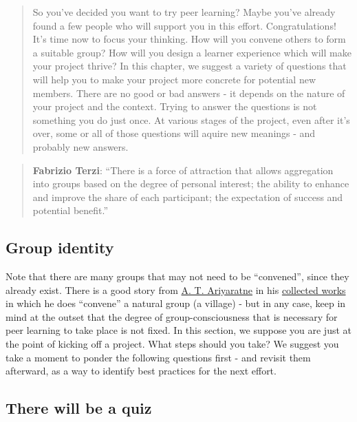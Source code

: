
\begin{quote}
So you've decided you want to try peer learning? Maybe you've already
found a few people who will support you in this effort. Congratulations!
It's time now to focus your thinking. How will you convene others to
form a suitable group? How will you design a learner experience which
will make your project thrive? In this chapter, we suggest a variety of
questions that will help you to make your project more concrete for
potential new members. There are no good or bad answers - it depends on
the nature of your project and the context. Trying to answer the
questions is not something you do just once. At various stages of the
project, even after it's over, some or all of those questions will
aquire new meanings - and probably new answers.
\end{quote}

\begin{quote}
\textbf{Fabrizio Terzi}: ``There is a force of attraction that allows
aggregation into groups based on the degree of personal interest; the
ability to enhance and improve the share of each participant; the
expectation of success and potential benefit.''
\end{quote}

\subsection{Group identity}

Note that there are many groups that may not need to be ``convened'',
since they already exist. There is a good story from
\href{http://www.sarvodayausa.org/learn/a-t-ariyartne/}{A. T.
Ariyaratne} in his
\href{http://www.sarvodaya.org/about/philosophy/collected-works-vol-1/rural-self-help}{collected
works} in which he does ``convene'' a natural group (a village) - but
in any case, keep in mind at the outset that the degree of
group-consciousness that is necessary for peer learning to take place
is not fixed. In this section, we suppose you are just at the point of
kicking off a project. What steps should you take? We suggest you take
a moment to ponder the following questions first - and revisit them
afterward, as a way to identify best practices for the next effort.

\subsection{There will be a quiz}

